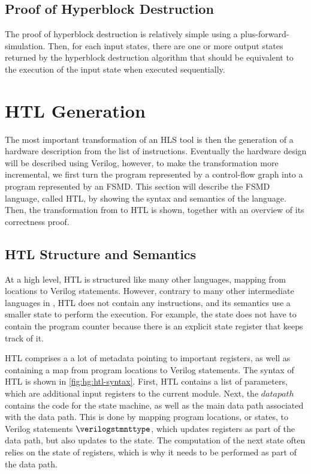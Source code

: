 \subsection{Proof of Hyperblock Destruction}

The proof of hyperblock destruction is relatively simple using a
\gls{plus-forward-simulation}.  Then, for each input states, there are one or
more output states returned by the hyperblock destruction algorithm that should
be equivalent to the execution of the input state when executed sequentially.

\section{HTL Generation}%
\label{sec:hg:htl-generation}

The most important transformation of an HLS tool is then the generation of a
hardware description from the list of instructions.  Eventually the hardware
design will be described using Verilog, however, to make the transformation more
incremental, we first turn the program represented by a control-flow graph into
a program represented by an \gls{FSMD}.  This section will describe the
\gls{FSMD} language, called HTL, by showing the syntax and semantics of the
language.  Then, the transformation from \rtlsubpar{} to HTL is shown, together
with an overview of its correctness proof.

\subsection{HTL Structure and Semantics}%
\label{sec:hg:htl-structure-and-semantics}

At a high level, HTL is structured like many other \compcert{} languages,
mapping from locations to Verilog statements.  However, contrary to many other
intermediate languages in \compcert{}, HTL does not contain any instructions,
and its semantics use a smaller state to perform the execution.  For example,
the state does not have to contain the program counter because there is an
explicit state register that keeps track of it.

HTL comprises a a lot of metadata pointing to important registers, as well as
containing a map from program locations to Verilog statements.  The syntax of
HTL is shown in \cref{fig:hg:htl-syntax}.  First, HTL contains a list of
parameters, which are additional input registers to the current module.  Next,
the $\mathit{datapath}$ contains the code for the state machine, as well as the
main data path associated with the data path.  This is done by mapping program
locations, or states, to Verilog statements $\verilogstmnttype$, which updates
registers as part of the data path, but also updates to the state.  The
computation of the next state often relies on the state of registers, which is
why it needs to be performed as part of the data path.

